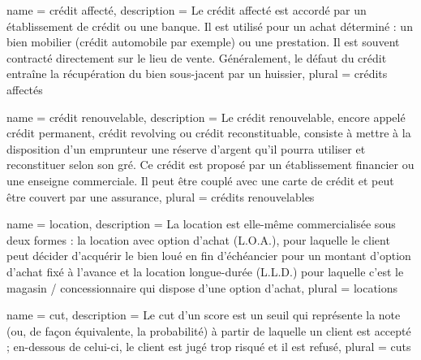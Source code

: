 {
	name = crédit affecté,
	description = {Le crédit affecté est accordé par un établissement de crédit ou une banque. Il est utilisé pour un achat déterminé : un bien mobilier (crédit automobile par exemple) ou une prestation. Il est souvent contracté directement sur le lieu de vente. Généralement, le défaut du crédit entraîne la récupération du bien sous-jacent par un huissier},
	plural = crédits affectés
}

{
	name = crédit renouvelable,
	description = {Le crédit renouvelable, encore appelé crédit permanent, crédit revolving ou crédit reconstituable, consiste à mettre à la disposition d'un emprunteur une réserve d'argent qu'il pourra utiliser et reconstituer selon son gré. Ce crédit est proposé par un établissement financier ou une enseigne commerciale. Il peut être couplé avec une carte de crédit et peut être couvert par une assurance},
	plural = crédits renouvelables
}

{
	name = location,
	description = {La location est elle-même commercialisée sous deux formes : la location avec option d'achat (L.O.A.), pour laquelle le client peut décider d'acquérir le bien loué en fin d'échéancier pour un montant d'option d'achat fixé à l'avance et la location longue-durée (L.L.D.) pour laquelle c'est le magasin / concessionnaire qui dispose d'une option d'achat},
	plural = locations
}

{
	name = cut,
	description = {Le cut d'un score est un seuil qui représente la note (ou, de façon équivalente, la probabilité) à partir de laquelle un client est accepté ; en-dessous de celui-ci, le client est jugé trop risqué et il est refusé},
	plural = cuts
}






